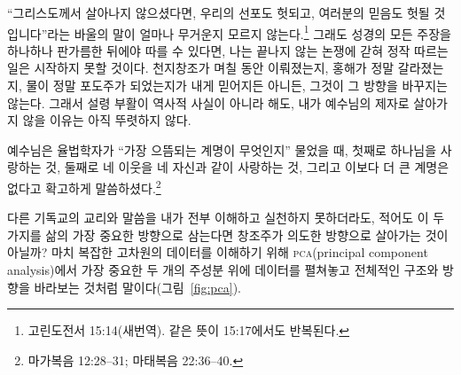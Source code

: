 \documentclass[11pt]{article}
\begin{document}
“그리스도께서 살아나지 않으셨다면, 우리의 선포도 헛되고, 여러분의 믿음도
헛될 것입니다”라는 바울의 말이 얼마나 무거운지 모르지 않는다.\footnote{고린도전서
15:14(새번역). 같은 뜻이 15:17에서도 반복된다.} 그래도 성경의 모든 주장을
하나하나 판가름한 뒤에야 따를 수 있다면, 나는 끝나지 않는 논쟁에 갇혀 정작
따르는 일은 시작하지 못할 것이다. 천지창조가 며칠 동안
이뤄졌는지, 홍해가 정말 갈라졌는지, 물이 정말 포도주가 되었는지가 내게
믿어지든 아니든, 그것이 그 방향을 바꾸지는 않는다. 그래서 설령 부활이 역사적
사실이 아니라 해도, 내가 예수님의 제자로 살아가지 않을 이유는 아직 뚜렷하지
않다.

예수님은 율법학자가 “가장 으뜸되는 계명이 무엇인지” 물었을 때, 첫째로 하나님을
사랑하는 것, 둘째로 네 이웃을 네 자신과 같이 사랑하는 것, 그리고 이보다 더 큰
계명은 없다고 확고하게 말씀하셨다.\footnote{마가복음 12:28--31; 마태복음
22:36--40.}

다른 기독교의 교리와 말씀을 내가 전부 이해하고 실천하지 못하더라도, 적어도 이 두
가지를 삶의 가장 중요한 방향으로 삼는다면 창조주가 의도한 방향으로 살아가는 것이
아닐까? 마치 복잡한 고차원의 데이터를 이해하기 위해 \textsc{pca}(principal
component analysis)에서 가장 중요한 두 개의 주성분 위에 데이터를 펼쳐놓고 전체적인
구조와 방향을 바라보는 것처럼 말이다(그림~\ref{fig:pca}).
\end{document}
